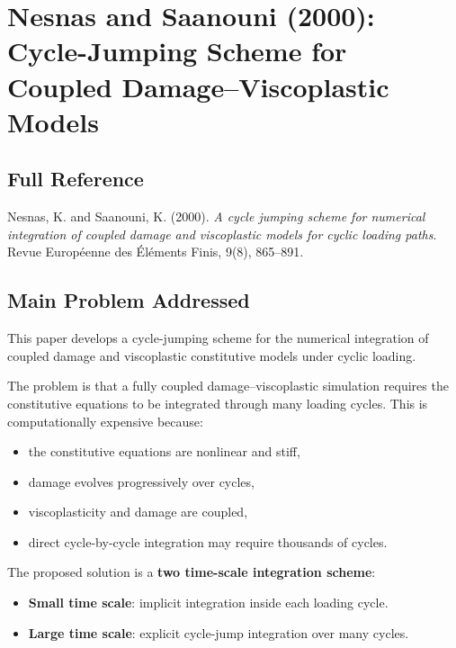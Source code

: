 ﻿\documentclass[11pt,a4paper]{article}
\begin{document}
\section{Nesnas and Saanouni (2000): Cycle-Jumping Scheme for Coupled Damage--Viscoplastic Models}

\subsection{Full Reference}

Nesnas, K. and Saanouni, K. (2000).
\textit{A cycle jumping scheme for numerical integration of coupled damage and viscoplastic models for cyclic loading paths}.
Revue Europ\'eenne des \'El\'ements Finis, 9(8), 865--891.

\subsection{Main Problem Addressed}

This paper develops a cycle-jumping scheme for the numerical integration of coupled damage and viscoplastic constitutive models under cyclic loading.

The problem is that a fully coupled damage--viscoplastic simulation requires the constitutive equations to be integrated through many loading cycles. This is computationally expensive because:

\begin{itemize}[leftmargin=*]
    \item the constitutive equations are nonlinear and stiff,
    \item damage evolves progressively over cycles,
    \item viscoplasticity and damage are coupled,
    \item direct cycle-by-cycle integration may require thousands of cycles.
\end{itemize}

The proposed solution is a \textbf{two time-scale integration scheme}:

\begin{itemize}[leftmargin=*]
    \item \textbf{Small time scale}: implicit integration inside each loading cycle.
    \item \textbf{Large time scale}: explicit cycle-jump integration over many cycles.
\end{itemize}
\end{document}

